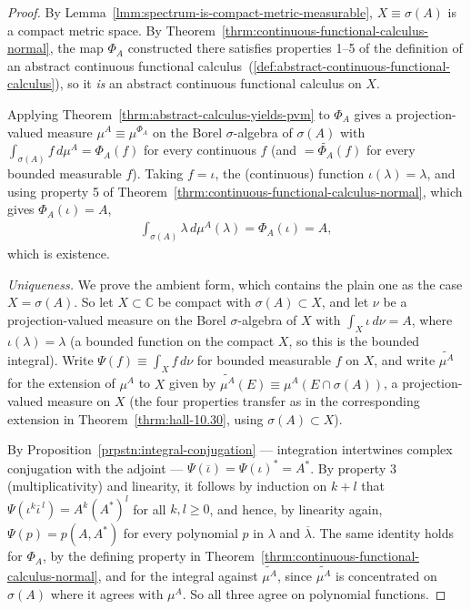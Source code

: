 \begin{proof}
    \leanok
By Lemma~\ref{lmm:spectrum-is-compact-metric-measurable}, $X \equiv \sigma(A)$ is a compact metric space. By Theorem~\ref{thrm:continuous-functional-calculus-normal}, the map $\Phi_A$ constructed there satisfies properties 1–5 of the definition of an abstract continuous functional calculus~(\ref{def:abstract-continuous-functional-calculus}), so it \textit{is} an abstract continuous functional calculus on $X$.

Applying Theorem~\ref{thrm:abstract-calculus-yields-pvm} to $\Phi_A$ gives a projection-valued measure $\mu^A \equiv \mu^{\Phi_A}$ on the Borel $\sigma$-algebra of $\sigma(A)$ with $\int_{\sigma(A)} f \, d\mu^A = \Phi_A(f)$ for every continuous $f$ (and $= \widetilde{\Phi_A}(f)$ for every bounded measurable $f$). Taking $f = \iota$, the (continuous) function $\iota(\lambda) = \lambda$, and using property 5 of Theorem~\ref{thrm:continuous-functional-calculus-normal}, which gives $\Phi_A(\iota) = A$,
\begin{align}
    \int_{\sigma(A)} \lambda \, d\mu^A(\lambda) = \Phi_A(\iota) = A,
\end{align}
which is existence.

\textit{Uniqueness.} We prove the ambient form, which contains the plain one as the case $X = \sigma(A)$. So let $X \subset \mathbb{C}$ be compact with $\sigma(A) \subset X$, and let $\nu$ be a projection-valued measure on the Borel $\sigma$-algebra of $X$ with $\int_X \iota \, d\nu = A$, where $\iota(\lambda) = \lambda$ (a bounded function on the compact $X$, so this is the bounded integral). Write $\Psi(f) \equiv \int_X f \, d\nu$ for bounded measurable $f$ on $X$, and write $\widetilde{\mu^A}$ for the extension of $\mu^A$ to $X$ given by $\widetilde{\mu^A}(E) \equiv \mu^A(E \cap \sigma(A))$, a projection-valued measure on $X$ (the four properties transfer as in the corresponding extension in Theorem~\ref{thrm:hall-10.30}, using $\sigma(A) \subset X$).

By Proposition~\ref{prpstn:integral-conjugation} — integration intertwines complex conjugation with the adjoint — $\Psi(\overline\iota) = \Psi(\iota)^* = A^*$. By property 3 (multiplicativity) and linearity, it follows by induction on $k+l$ that $\Psi(\iota^k\overline\iota^{\,l}) = A^k(A^*)^l$ for all $k,l \ge 0$, and hence, by linearity again, $\Psi(p) = p(A,A^*)$ for every polynomial $p$ in $\lambda$ and $\overline\lambda$. The same identity holds for $\Phi_A$, by the defining property in Theorem~\ref{thrm:continuous-functional-calculus-normal}, and for the integral against $\widetilde{\mu^A}$, since $\widetilde{\mu^A}$ is concentrated on $\sigma(A)$ where it agrees with $\mu^A$. So all three agree on polynomial functions.


\end{proof}
